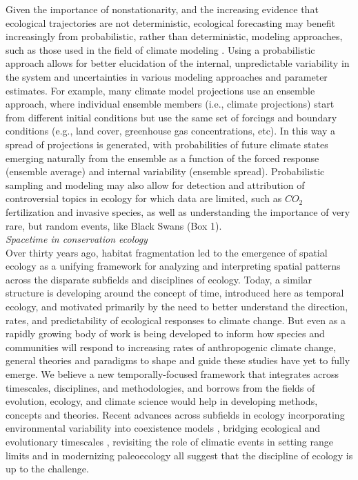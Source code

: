 \documentclass[11pt,a4paper,oneside]{article}
\begin{document}
Given the importance of nonstationarity, and the increasing evidence that ecological trajectories are not deterministic, ecological forecasting may benefit increasingly from probabilistic, rather than deterministic, modeling approaches, such as those used in the field of climate modeling \citep{Tebaldi2007}. Using a probabilistic approach allows for better elucidation of the internal, unpredictable variability in the system and uncertainties in various modeling approaches and parameter estimates. For example, many climate model projections use an ensemble approach, where individual ensemble members (i.e., climate projections) start from different initial conditions but use the same set of forcings and boundary conditions (e.g., land cover, greenhouse gas concentrations, etc). In this way a spread of projections is generated, with probabilities of future climate states emerging naturally from the ensemble as a function of the forced response (ensemble average) and internal variability (ensemble spread). Probabilistic sampling and modeling may also allow for detection and attribution of controversial topics in ecology for which data are limited, such as $CO_{2}$ fertilization and invasive species, as well as understanding the importance of very rare, but random events, like Black Swans (Box 1).\\

\noindent \emph{Spacetime in conservation ecology}\\
Over thirty years ago, habitat fragmentation led to the emergence of spatial ecology as a unifying framework for analyzing and interpreting spatial patterns across the disparate subfields and disciplines of ecology. Today, a similar structure is developing around the concept of time, introduced here as temporal ecology, and motivated primarily by the need to better understand the direction, rates, and predictability of ecological responses to climate change. But even as a rapidly growing body of work is being developed to inform how species and communities will respond to increasing rates of anthropogenic climate change, general theories and paradigms to shape and guide these studies have yet to fully emerge. We believe a new temporally-focused framework that integrates across timescales, disciplines, and methodologies, and borrows from the fields of evolution, ecology, and climate science would help in developing methods, concepts and theories. Recent advances across subfields in ecology incorporating environmental variability into coexistence models \citep{Chesson:1997dz}, bridging ecological and evolutionary timescales \citep{schoener2011}, revisiting the role of climatic events in setting range limits \citep{Tran2007} and in modernizing paleoecology \citep{Brewer2012} all suggest that the discipline of ecology is up to the challenge. %
\end{document}

